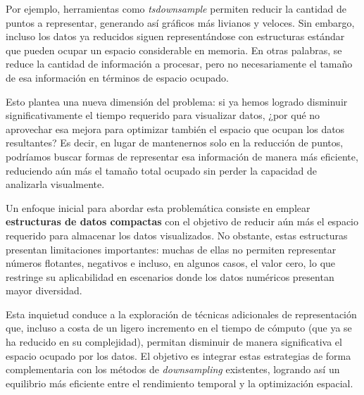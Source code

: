 
Por ejemplo, herramientas como \textit{tsdownsample} permiten reducir la cantidad de puntos a representar, generando así gráficos más livianos y veloces. Sin embargo, incluso los datos ya reducidos siguen representándose con estructuras estándar que pueden ocupar un espacio considerable en memoria. En otras palabras, se reduce la cantidad de información a procesar, pero no necesariamente el tamaño de esa información en términos de espacio ocupado.

Esto plantea una nueva dimensión del problema: si ya hemos logrado disminuir significativamente el tiempo requerido para visualizar datos, ¿por qué no aprovechar esa mejora para optimizar también el espacio que ocupan los datos resultantes? Es decir, en lugar de mantenernos solo en la reducción de puntos, podríamos buscar formas de representar esa información de manera más eficiente, reduciendo aún más el tamaño total ocupado sin perder la capacidad de analizarla visualmente.

Un enfoque inicial para abordar esta problemática consiste en emplear \textbf{estructuras de datos compactas} con el objetivo de reducir aún más el espacio requerido para almacenar los datos visualizados. No obstante, estas estructuras presentan limitaciones importantes: muchas de ellas no permiten representar números flotantes, negativos e incluso, en algunos casos, el valor cero, lo que restringe su aplicabilidad en escenarios donde los datos numéricos presentan mayor diversidad.

Esta inquietud conduce a la exploración de técnicas adicionales de representación que, incluso a costa de un ligero incremento en el tiempo de cómputo (que ya se ha reducido en su complejidad), permitan disminuir de manera significativa el espacio ocupado por los datos. El objetivo es integrar estas estrategias de forma complementaria con los métodos de \textit{downsampling} existentes, logrando así un equilibrio más eficiente entre el rendimiento temporal y la optimización espacial.


